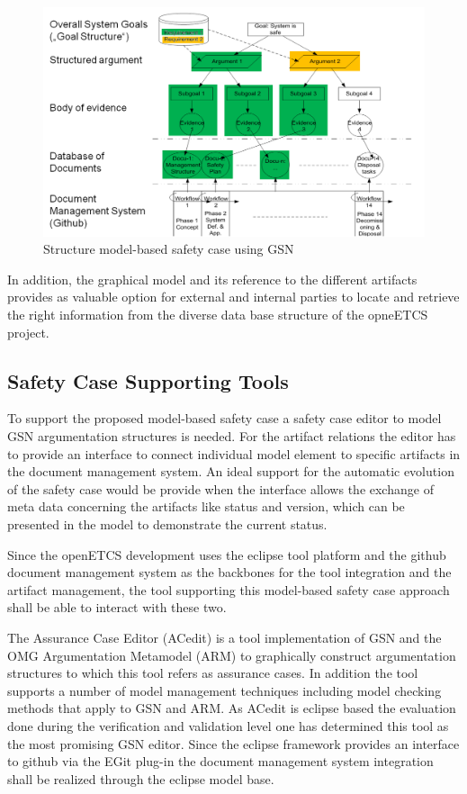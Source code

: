 \documentclass{template/openetcs_report}
\begin{document}
\begin{figure}[htbp]
\centering
\includegraphics[width=0.9\linewidth]{./images/Structure-SC-GSN}
\caption{Structure model-based safety case using GSN}
\label{fig:GSN-SafetyCase}
\end{figure}

 In addition, the graphical model and its reference to the different artifacts provides as valuable option for external and internal parties to locate and retrieve the right information from the diverse data base structure of the opneETCS project.

\subsection{Safety Case Supporting Tools}

To support the proposed model-based safety case a safety case editor to model GSN argumentation structures is needed. For the artifact relations the editor has to provide an interface to connect individual model element to specific artifacts in the document management system. An ideal support for the automatic evolution of the safety case would be provide when the interface allows the exchange of meta data concerning the artifacts like status and version, which can be presented in the model to demonstrate the current status.

Since the openETCS development uses the eclipse tool platform and the github document management system as the backbones for the tool integration and the artifact management, the tool supporting this model-based safety case approach shall be able to interact with these two. 

The Assurance Case Editor (ACedit) \cite{aceditwebsite} is a tool implementation of GSN \cite{GSNwebsite} and the OMG Argumentation  Metamodel  (ARM) \cite{ARMwebsite} to graphically construct argumentation structures to which this tool refers as assurance cases. In addition the tool supports a number of model management techniques including model checking methods that apply to GSN and ARM. As ACedit is eclipse based the evaluation done during the verification and validation level one has determined this tool as the most promising GSN editor. Since the eclipse framework provides an interface to github via the EGit plug-in the document management system integration shall be realized through the eclipse model base.
\end{document}
